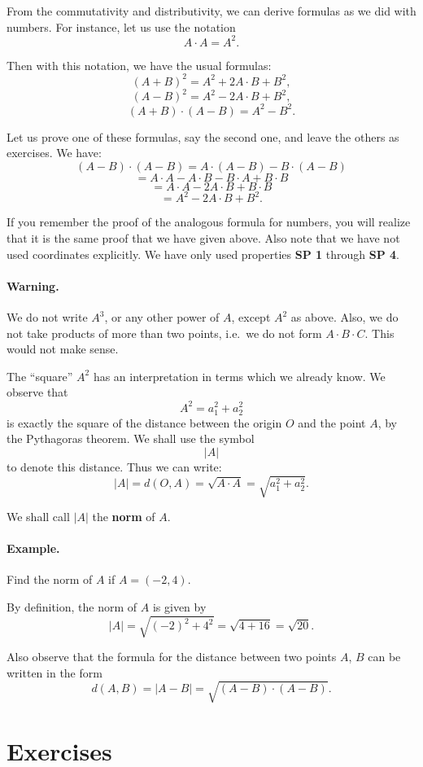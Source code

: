 \documentclass[12pt]{book} %
\begin{document}
\begin{ExerciseList}
From the commutativity and distributivity, we can derive formulas as we did with numbers. For instance, let us use the notation
\[
A\cdot A=A^2.
\]

Then with this notation, we have the usual formulas:
\[
(A+B)^2=A^2+2A\cdot B+B^2,
\]
\[
(A-B)^2=A^2-2A\cdot B+B^2,
\]
\[
(A+B)\cdot(A-B)=A^2-B^2.
\]

Let us prove one of these formulas, say the second one, and leave the others as exercises. We have:
\[
(A-B)\cdot(A-B)=A\cdot(A-B)-B\cdot(A-B)
\]
\[
= A\cdot A-A\cdot B-B\cdot A+B\cdot B
\]
\[
= A\cdot A-2A\cdot B+B\cdot B
\]
\[
= A^2-2A\cdot B+B^2.
\]

If you remember the proof of the analogous formula for numbers, you will realize that it is the same proof that we have given above. Also note that we have not used coordinates explicitly. We have only used properties \textbf{SP 1} through \textbf{SP 4}.

\paragraph{Warning.}
We do not write $A^3$, or any other power of $A$, except $A^2$ as above. Also, we do not take products of more than two points, i.e.\ we do not form $A\cdot B\cdot C$. This would not make sense.

The ``square'' $A^2$ has an interpretation in terms which we already know. We observe that
\[
A^2=a_1^2+a_2^2
\]
is exactly the square of the distance between the origin $O$ and the point $A$, by the Pythagoras theorem. We shall use the symbol
\[
|A|
\]
to denote this distance. Thus we can write:
\[
|A|=d(O,A)=\sqrt{A\cdot A}=\sqrt{a_1^2+a_2^2}.
\]

We shall call $|A|$ the \textbf{norm} of $A$.

\paragraph{Example.}
Find the norm of $A$ if $A=(-2,4)$.

By definition, the norm of $A$ is given by
\[
|A|=\sqrt{(-2)^2+4^2}=\sqrt{4+16}=\sqrt{20}.
\]

Also observe that the formula for the distance between two points $A$, $B$ can be written in the form
\[
d(A,B)=|A-B|=\sqrt{(A-B)\cdot(A-B)}.
\]

\section*{Exercises}


\end{ExerciseList}
\end{document}
